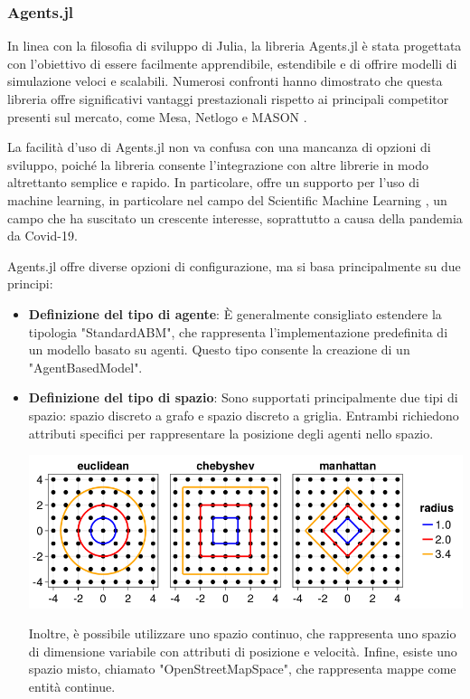 \subsubsection{Agents.jl}

In linea con la filosofia di sviluppo di Julia, la libreria Agents.jl 
\cite{Agents.jl} è stata progettata con l'obiettivo di essere facilmente 
apprendibile, estendibile e di offrire modelli di simulazione veloci e 
scalabili. Numerosi confronti hanno dimostrato che questa libreria offre 
significativi vantaggi prestazionali rispetto ai principali competitor 
presenti sul mercato, come Mesa, Netlogo e MASON \cite{ABAR201713}.

La facilità d'uso di Agents.jl non va confusa con una mancanza di opzioni 
di sviluppo, poiché la libreria consente l'integrazione con altre 
librerie in modo altrettanto semplice e rapido. In particolare, offre un 
supporto per l'uso di machine learning, in particolare nel campo del 
Scientific Machine Learning \cite{rackauckas2017differentialequations}, 
un campo che ha suscitato un crescente interesse, soprattutto a 
causa della pandemia da Covid-19.

Agents.jl offre diverse opzioni di configurazione, ma si basa principalmente su due principi:

\begin{itemize}
    \item \textbf{Definizione del tipo di agente}: È generalmente 
    consigliato estendere la tipologia "StandardABM", che rappresenta 
    l'implementazione predefinita di un modello basato su agenti. 
    Questo tipo consente la creazione di un "AgentBasedModel".
    \item \textbf{Definizione del tipo di spazio}: Sono supportati 
    principalmente due tipi di spazio: spazio discreto a grafo 
    \cite{Graphs2021} e spazio discreto a griglia. Entrambi 
    richiedono attributi specifici per rappresentare la posizione degli 
    agenti nello spazio.

    \begin{minipage}{\linewidth}
        \centering
        \includegraphics[width=\textwidth]{img/distance.png}
        \label{fig:gridspace_distances}
    \end{minipage}

    Inoltre, è possibile utilizzare uno spazio continuo, che 
    rappresenta uno spazio di dimensione variabile con attributi di 
    posizione e velocità. Infine, esiste uno spazio misto, chiamato 
    "OpenStreetMapSpace", che rappresenta mappe come entità continue.
\end{itemize}

